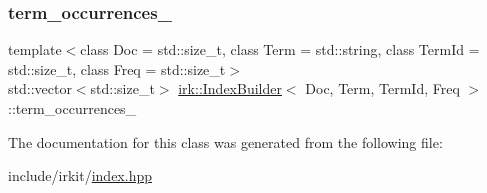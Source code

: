 \mbox{\label{classirk_1_1IndexBuilder_a3cc49bbc84aafe3f26bb215b37b720a0}} 
\subsubsection{\texorpdfstring{term\+\_\+occurrences\+\_\+}{term\_occurrences\_}}
{\footnotesize\ttfamily template$<$class Doc  = std\+::size\+\_\+t, class Term  = std\+::string, class Term\+Id  = std\+::size\+\_\+t, class Freq  = std\+::size\+\_\+t$>$ \\
std\+::vector$<$std\+::size\+\_\+t$>$ \mbox{\hyperlink{classirk_1_1IndexBuilder}{irk\+::\+Index\+Builder}}$<$ Doc, Term, Term\+Id, Freq $>$\+::term\+\_\+occurrences\+\_\+\hspace{0.3cm}{\ttfamily [protected]}}



The documentation for this class was generated from the following file\+:\begin{DoxyCompactItemize}
\item 
include/irkit/\mbox{\hyperlink{irkit_2index_8hpp}{index.\+hpp}}\end{DoxyCompactItemize}
